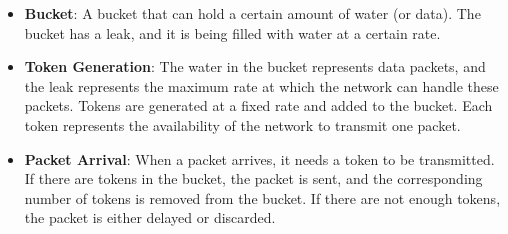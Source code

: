 \documentclass{korigamik}
\begin{document}
\begin{itemize}

	\item \textbf{Bucket}: A bucket that can hold a certain amount of water (or
	      data). The bucket has a leak, and it is being filled with water at a
	      certain rate.

	\item \textbf{Token Generation}: The water in the bucket represents data
	      packets, and the leak represents the maximum rate at which the network can
	      handle these packets. Tokens are generated at a fixed rate and added to the
	      bucket. Each token represents the availability of the network to transmit
	      one packet.

	\item \textbf{Packet Arrival}: When a packet arrives, it needs a token to be
	      transmitted. If there are tokens in the bucket, the packet is sent, and the
	      corresponding number of tokens is removed from the bucket. If there are not
	      enough tokens, the packet is either delayed or discarded.

\end{itemize}
\end{document}
